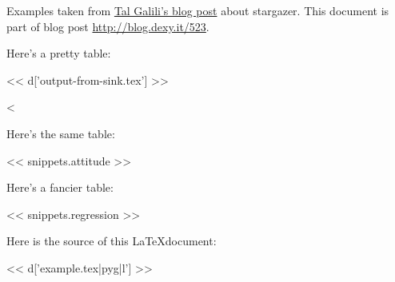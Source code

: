 \documentclass{article}
\begin{document}
Examples taken from \href{http://bit.ly/10TgaJp}{Tal Galili's blog post} about
stargazer.  This document is part of blog post \url{http://blog.dexy.it/523}.

Here's a pretty table:

<< d['output-from-sink.tex'] >>

<%

Here's the same table:

<< snippets.attitude >>

Here's a fancier table:

<< snippets.regression >>

Here is the source of this \LaTeX document:

<< d['example.tex|pyg|l'] >>
\end{document}
